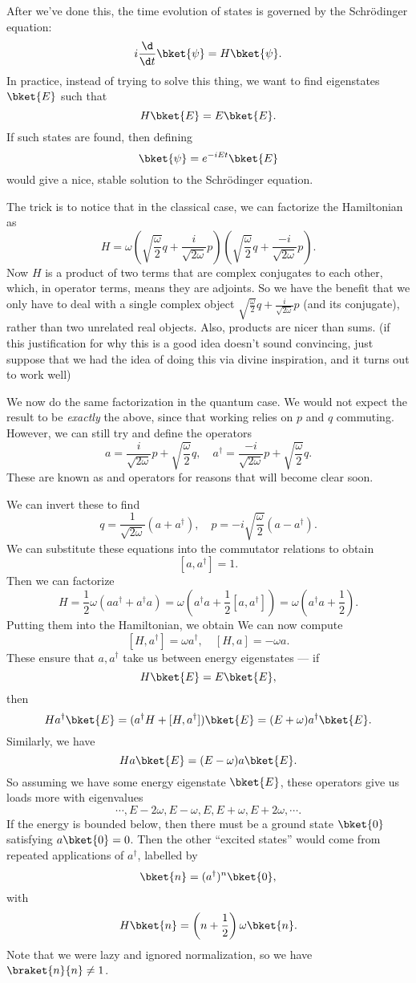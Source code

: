 \documentclass[a4paper]{article}
\begin{document}
After we've done this, the time evolution of states is governed by the Schr\"odinger equation:
\[
  i\frac{\d}{\d t}\bket{\psi} = H\bket{\psi}.
\]
In practice, instead of trying to solve this thing, we want to find eigenstates $\bket{E}$ such that
\[
  H \bket{E} = E\bket{E}.
\]
If such states are found, then defining
\[
  \bket{\psi} = e^{-iEt}\bket{E}
\]
would give a nice, stable solution to the Schr\"odinger equation.

The trick is to notice that in the classical case, we can factorize the Hamiltonian as
\[
  H = \omega \left(\sqrt{\frac{\omega}{2}}q + \frac{i}{\sqrt{2\omega}}p\right)\left(\sqrt{\frac{\omega}{2}}q + \frac{-i}{\sqrt{2\omega}}p\right).
\]
Now $H$ is a product of two terms that are complex conjugates to each other, which, in operator terms, means they are adjoints. So we have the benefit that we only have to deal with a single complex object $\sqrt{\frac{\omega}{2}}q + \frac{i}{\sqrt{2\omega}}p$ (and its conjugate), rather than two unrelated real objects. Also, products are nicer than sums. (if this justification for why this is a good idea doesn't sound convincing, just suppose that we had the idea of doing this via divine inspiration, and it turns out to work well)

We now do the same factorization in the quantum case. We would not expect the result to be \emph{exactly} the above, since that working relies on $p$ and $q$ commuting. However, we can still try and define the operators
\[
  a = \frac{i}{\sqrt{2 \omega}}p + \sqrt{\frac{\omega}{2}}q,\quad a^\dagger = \frac{-i}{\sqrt{2\omega}}p + \sqrt{\frac{\omega}{2}}q.
\]
These are known as  and  operators for reasons that will become clear soon.

We can invert these to find
\[
  q = \frac{1}{\sqrt{2\omega}}(a + a^\dagger),\quad p = -i\sqrt{\frac{\omega}{2}} (a - a^\dagger).
\]
We can substitute these equations into the commutator relations to obtain
\[
  [a, a^\dagger] = 1.
\]
Then we can factorize
\[
  H = \frac{1}{2}\omega(a a^\dagger + a^\dagger a) = \omega\left(a^\dagger a + \frac{1}{2}[a, a^\dagger]\right) = \omega \left(a^\dagger a + \frac{1}{2}\right).
\]
Putting them into the Hamiltonian, we obtain
We can now compute
\[
  [H, a^\dagger] = \omega a^\dagger,\quad [H, a] = -\omega a.
\]
These ensure that $a, a^\dagger$ take us between energy eigenstates --- if
\[
  H\bket{E} = E \bket{E},
\]
then
\[
  Ha^\dagger\bket{E} = (a^\dagger H + [H, a^\dagger]) \bket{E} = (E + \omega)a^\dagger \bket{E}.
\]
Similarly, we have
\[
  Ha\bket{E} = (E - \omega)a\bket{E}.
\]
So assuming we have some energy eigenstate $\bket{E}$, these operators give us loads more with eigenvalues
\[
  \cdots, E - 2\omega, E - \omega, E, E + \omega, E + 2\omega, \cdots.
\]
If the energy is bounded below, then there must be a ground state $\bket{0}$ satisfying $a \bket{0} = 0$. Then the other ``excited states'' would come from repeated applications of $a^\dagger$, labelled by
\[
  \bket{n} = (a^\dagger)^n \bket{0},
\]
with
\[
  H\bket{n} = \left(n + \frac{1}{2}\right)\omega \bket{n}.
\]
Note that we were lazy and ignored normalization, so we have $\braket{n}{n} \not= 1$.
\end{document}
